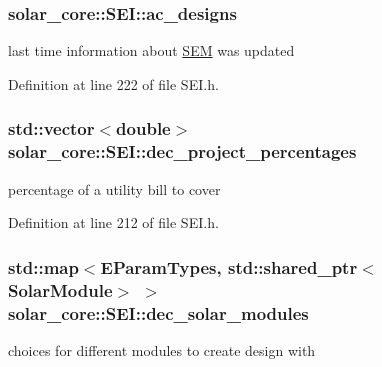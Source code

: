 \begin{figure}[H]
\begin{center}
\hypertarget{classsolar__core_1_1_s_e_i_a147ec60ca551d9195cdf5937eda5f903}{}
\subsubsection[{ac\+\_\+designs}]{ solar\+\_\+core\+::\+S\+E\+I\+::ac\+\_\+designs\hspace{0.3cm}{\ttfamily [protected]}}\label{classsolar__core_1_1_s_e_i_a147ec60ca551d9195cdf5937eda5f903}
last time information about \hyperlink{classsolar__core_1_1_s_e_m}{S\+E\+M} was updated 

Definition at line 222 of file S\+E\+I.\+h.

\hypertarget{classsolar__core_1_1_s_e_i_a272838ea17b8cd4e49c9a8c53facfd8f}{}
\subsubsection[{dec\+\_\+project\+\_\+percentages}]{\setlength{\rightskip}{0pt plus 5cm}std\+::vector$<$double$>$ solar\+\_\+core\+::\+S\+E\+I\+::dec\+\_\+project\+\_\+percentages\hspace{0.3cm}{\ttfamily [protected]}}\label{classsolar__core_1_1_s_e_i_a272838ea17b8cd4e49c9a8c53facfd8f}
percentage of a utility bill to cover 

Definition at line 212 of file S\+E\+I.\+h.

\hypertarget{classsolar__core_1_1_s_e_i_a79728143af5752e09c2be29cfa1cfd8f}{}
\subsubsection[{dec\+\_\+solar\+\_\+modules}]{\setlength{\rightskip}{0pt plus 5cm}std\+::map$<${\bf E\+Param\+Types}, std\+::shared\+\_\+ptr$<${\bf Solar\+Module}$>$ $>$ solar\+\_\+core\+::\+S\+E\+I\+::dec\+\_\+solar\+\_\+modules\hspace{0.3cm}{\ttfamily [protected]}}\label{classsolar__core_1_1_s_e_i_a79728143af5752e09c2be29cfa1cfd8f}
choices for different modules to create design with 


\end{center}
\end{figure}
